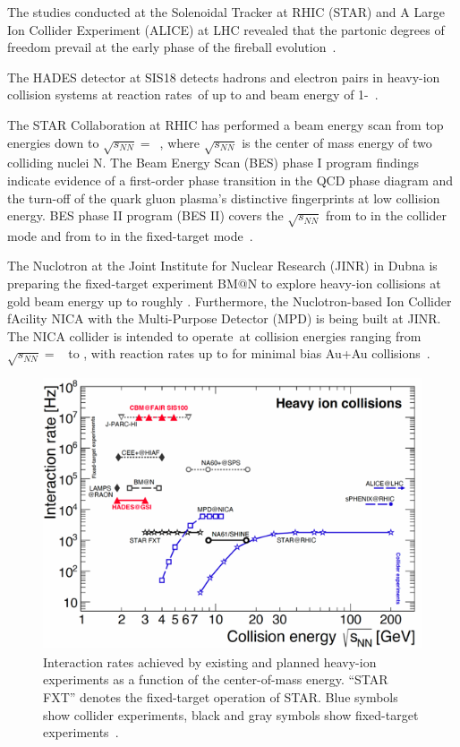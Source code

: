 The studies conducted at the Solenoidal Tracker at \gls{RHIC} (\gls{STAR}) and A Large Ion Collider Experiment (\gls{ALICE}) at \gls{LHC} revealed that the partonic degrees of freedom prevail at the early phase of the fireball evolution~\cite{CBM_physics}.

The HADES detector at SIS18 detects hadrons and electron pairs in heavy-ion collision systems at reaction rates of up to  and beam energy of 1-~\cite{Ablyazimov_2017}.


The STAR Collaboration at \gls{RHIC} has
performed a beam energy scan from top energies down
to $\sqrt{s_{NN}} =$~, where $\sqrt{s_{NN}}$ is the center of mass energy of two colliding nuclei N.  The Beam Energy Scan (\gls{BES}) phase I program findings indicate evidence of a first-order phase transition in the QCD phase diagram and the turn-off of the quark gluon plasma's distinctive fingerprints at low collision energy. BES phase II program (BES II) covers the $\sqrt{s_{NN}}$ from  to  in the collider mode and from  to  in the fixed-target mode~\cite{STAR2, STAR1}.

The Nuclotron at the Joint Institute for Nuclear Research (JINR) in Dubna is preparing the fixed-target experiment BM@N to explore heavy-ion collisions at gold beam energy up to roughly . Furthermore, the Nuclotron-based Ion Collider fAcility NICA with the Multi-Purpose Detector (MPD) is being built at JINR. The NICA collider is intended to operate at collision energies ranging from $\sqrt{s_{NN}} =$~ to , with reaction rates up to  for minimal bias Au+Au collisions~\cite{Ablyazimov_2017}.

\begin{figure}[!h]
    \centering
    \includegraphics[width=0.7\columnwidth]{Chapter1/images/interaction_rates.png}
    \caption{Interaction rates achieved by existing and planned heavy-ion experiments as a function of the center-of-mass energy. “STAR FXT” denotes the fixed-target operation of STAR.  Blue symbols show collider experiments, black and gray symbols show fixed-target experiments~\cite{Ablyazimov_2017}.}
    \label{fig:cbm_rates}
\end{figure}




